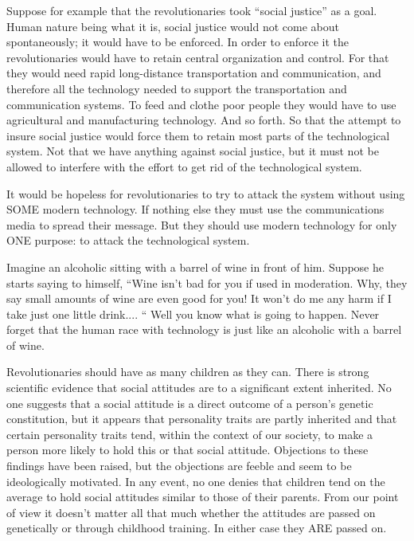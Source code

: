  Suppose for example that the revolutionaries took “social justice” as a goal. Human nature being what it is, social justice would not come about spontaneously; it would have to be enforced. In order to enforce it the revolutionaries would have to retain central organization and control. For that they would need rapid long-distance transportation and communication, and therefore all the technology needed to support the transportation and communication systems. To feed and clothe poor people they would have to use agricultural and manufacturing technology. And so forth. So that the attempt to insure social justice would force them to retain most parts of the technological system. Not that we have anything against social justice, but it must not be allowed to interfere with the effort to get rid of the technological system.

 It would be hopeless for revolutionaries to try to attack the system without using SOME modern technology. If nothing else they must use the communications media to spread their message. But they should use modern technology for only ONE purpose: to attack the technological system.

 Imagine an alcoholic sitting with a barrel of wine in front of him. Suppose he starts saying to himself, “Wine isn’t bad for you if used in moderation. Why, they say small amounts of wine are even good for you! It won’t do me any harm if I take just one little drink.... “ Well you know what is going to happen. Never forget that the human race with technology is just like an alcoholic with a barrel of wine.

 Revolutionaries should have as many children as they can. There is strong scientific evidence that social attitudes are to a significant extent inherited. No one suggests that a social attitude is a direct outcome of a person’s genetic constitution, but it appears that personality traits are partly inherited and that certain personality traits tend, within the context of our society, to make a person more likely to hold this or that social attitude. Objections to these findings have been raised, but the objections are feeble and seem to be ideologically motivated. In any event, no one denies that children tend on the average to hold social attitudes similar to those of their parents. From our point of view it doesn’t matter all that much whether the attitudes are passed on genetically or through childhood training. In either case they ARE passed on.

